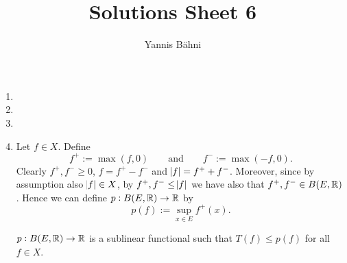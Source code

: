

\title{Solutions Sheet 6}
\author{Yannis B\"{a}hni}
\address[Yannis B\"{a}hni]{University of Zurich, R\"{a}mistrasse 71, 8006 Zurich}



\maketitle
\thispagestyle{fancy}

\setcounter{section}{1}

\begin{enumerate}[label = \textbf{Exercise \arabic*.},wide = 0pt, itemsep = 1.5ex]
	\item
	\item
	\item
	\item Let $f \in X$. Define
		\begin{equation*}
			f^+ := \max(f,0) \qquad \text{and} \qquad f^- := \max(-f,0).
		\end{equation*} 
		Clearly $f^+,f^- \geq 0$, $f = f^+ - f^-$ and $\abs{f} = f^+ + f^-$. Moreover, since by assumption also $\abs{f} \in X$, by $f^+,f^- \leq \abs{f}$ we have also that $f^+,f^- \in B(E,\mathbb{R})$. Hence we can define $p : B(E,\mathbb{R}) \to \mathbb{R}$ by
		\begin{equation*}
			p(f) := \sup_{x \in E}f^+(x).
		\end{equation*}

		\begin{lemma}
			$p : B(E,\mathbb{R}) \to \mathbb{R}$ is a sublinear functional such that $T(f) \leq p(f)$ for all $f \in X$.
			\label{lem:sublinear_functional}
		\end{lemma} 


\end{enumerate}
